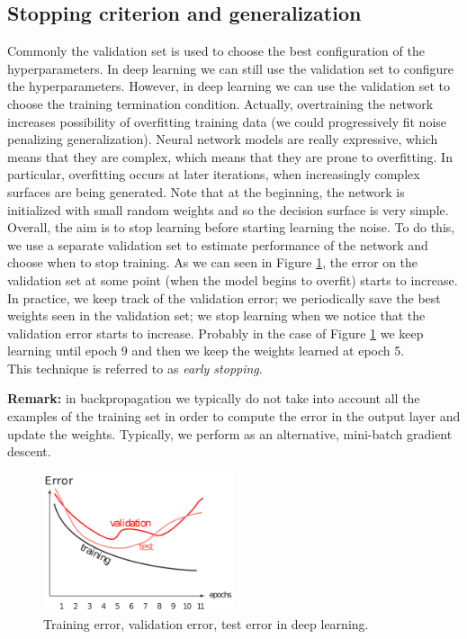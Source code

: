 \subsection{Stopping criterion and generalization}
Commonly the validation set is used to choose the best configuration of the hyperparameters. In deep learning we can still use the validation set to configure the hyperparameters. However, in deep learning we can use the validation set to choose the training termination condition. Actually, overtraining the network increases possibility of overfitting training data (we could progressively fit noise penalizing generalization). Neural network models are really expressive, which means that they are complex, which means that they are prone to overfitting. In particular, overfitting occurs at later iterations, when increasingly complex surfaces are being generated. Note that at the beginning, the network is initialized with small random weights and so the decision surface is very simple. Overall, the aim is to stop learning before starting learning the noise. To do this, we use a separate validation set to estimate performance of the network and choose when to stop training. As we can seen in Figure \ref{fig:deep_training_test_valudation}, the error on the validation set at some point (when the model begins to overfit) starts to increase. In practice, we keep track of the validation error; we periodically save the best weights seen in the validation set; we stop learning when we notice that the validation error starts to increase. Probably in the case of Figure \ref{fig:deep_training_test_valudation} we keep learning until epoch 9 and then we keep the weights learned at epoch 5.\\ This technique is referred to as \textit{early stopping}. \newline

\textbf{Remark:} in backpropagation we typically do not take into account all the examples of the training set in order to compute the error in the output layer and update the weights. Typically, we perform as an alternative, mini-batch gradient descent.

\begin{figure}
    \centering
    \includegraphics[width=0.5\textwidth]{images/deep_training_test_valudation.png}
    \caption{Training error, validation error, test error in deep learning.}
    \label{fig:deep_training_test_valudation}
\end{figure}

